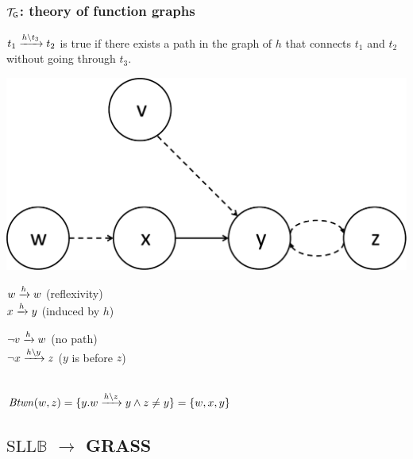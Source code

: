 \documentclass{beamer}
\begin{document}
\begin{frame}
  \frametitle{$\graphtheory$: theory of function graphs}
  
  $\creach{t_1}{t_2}{t_3}$ is true if there exists a path in the graph of $h$ that connects $t_1$ and $t_2$ without going through $t_3$.
  
  \vspace{1ex}

  \begin{center}
  \includegraphics[scale=0.4]{resources/t_reach1.pdf}
  \end{center}

  \begin{minipage}{.45\linewidth}
  $\reach{w}{w}$ (reflexivity)\\[1ex]
  $\reach{x}{y}$ (induced by $h$)
  \end{minipage}
  \begin{minipage}{.45\linewidth}
  $\neg\reach{v}{w}$ (no path)\\[1ex]
  $\neg\creach{x}{z}{y}$ ($y$ is before $z$)
  \end{minipage}\\[1ex]
  $\Btwn(w,z) = \{y. \creach{w}{y}{z} \land z \neq y\} = \{ w,x,y \}$

\end{frame}

\subsection{$\text{SLL}\mathbb{B}$ $\rightarrow$ GRASS}
\end{document}
